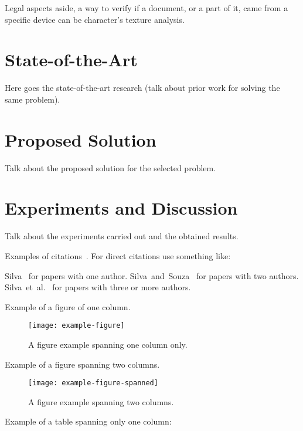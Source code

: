 \documentclass[10pt,twocolumn,letterpaper]{article}
\newcommand{\CITEONE}[2]{\mbox{#1 \cite{#2}}}
\newcommand{\CITETWO}[3]{\mbox{#1 and #2 \cite{#3}}}
\newcommand{\CITEN}[2]{\mbox{#1 et al. \cite{#2}}}
\begin{document}
Legal aspects aside, a way to verify if a document, or a part of it, came from a specific device can be character's texture analysis.


\section{State-of-the-Art}
Here goes the state-of-the-art research (talk about prior work for solving the same problem). 

\section{Proposed Solution}
Talk about the proposed solution for the selected problem. 

\section{Experiments and Discussion}
Talk about the experiments carried out and the obtained results. 

Examples of citations~\cite{Ni_2008, Ni_2009}. For direct citations use something like: 

\CITEONE{Silva}{Silva_2010} for papers with one author.
\CITETWO{Silva}{Souza}{Silva_2010b} for papers with two authors.
\CITEN{Silva}{Silva_2010c} for papers with three or more authors.

Example of a figure of one column. 
\begin{figure}
\begin{center}
	\texttt{[image: example-figure]}
	\caption{A figure example spanning one column only.\label{fig:label}}   
\end{center} 
\end{figure}   

Example of a figure spanning two columns. 
\begin{figure*}
\begin{center}
	\texttt{[image: example-figure-spanned]}
	\caption{A figure example spanning two columns.\label{fig:label2}}   
\end{center} 
\end{figure*}

Example of a table spanning only one column: 
\end{document}

